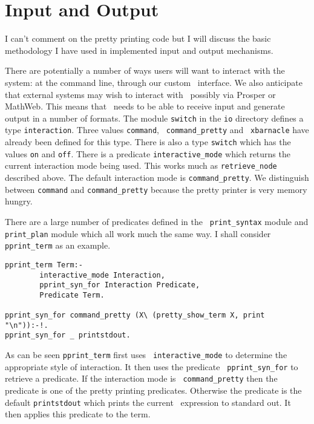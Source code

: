 \section{Input and Output}
I can't comment on the pretty printing code but I will discuss the
basic methodology I have used in implemented input and output
mechanisms.

There are potentially a number of ways users will want to interact
with the system: at the command line, through our
custom \xlclam\ interface\index{\xlclam}.  We also anticipate that
external systems may wish to interact with \lclam\ possibly via {\sc
  Prosper} or {\sc MathWeb}.  This means that \lclam\ needs to be able
to receive input and generate output in a number of formats.  The
module {\tt switch} in the {\tt io} directory
defines a type {\tt interaction}.  Three values
{\tt command}, {\tt
  command\_pretty} and {\tt
  xbarnacle} have already been defined for this type.
There is also a type {\tt switch} which has the
values {\tt on} and {\tt off}.  There is a
predicate {\tt interactive\_mode} which
returns the current interaction mode being used.  This works much as
{\tt retrieve\_node} described above.  The
default interaction mode is {\tt command\_pretty}.  We distinguish
between {\tt command} and {\tt command\_pretty} because the pretty
printer is very memory hungry.

There are a large number of predicates defined in the {\tt
  print\_syntax} module and {\tt
  print\_plan} module which all work much
the same way.  I shall consider {\tt pprint\_term} 
as an example.  
\begin{verbatim}
pprint_term Term:-
        interactive_mode Interaction,
        pprint_syn_for Interaction Predicate,
        Predicate Term.

pprint_syn_for command_pretty (X\ (pretty_show_term X, print "\n")):-!.
pprint_syn_for _ printstdout.
\end{verbatim}
As can be seen {\tt pprint\_term} first uses {\tt
  interactive\_mode} to determine the
appropriate style of interaction.  It then uses the predicate {\tt
  pprint\_syn\_for} to retrieve a predicate.
If the interaction mode is {\tt
  command\_pretty} then the predicate is  
one of the pretty printing predicates.  Otherwise the predicate is the 
default {\tt printstdout} which prints the current
\lprolog\ expression to standard out.  It then applies this predicate
to the term.

